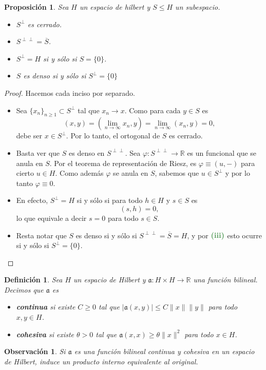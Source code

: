 \documentclass[11pt]{report}
\theoremstyle{colored}
\newtheorem{definition}{Definición}[section]
\newtheorem{proposition}{Proposición}[section]
\newtheorem{remark}{Observación}[section]
\newcommand{\R}{\mathbb{R}}
\newcommand{\ip}[1]{( #1 )}
\newcommand{\paint}[1]{\color{color}{#1}}
\newcommand{\tpaint}[1]{\paint{\textbf{#1}}}
\begin{document}
\begin{proposition} Sea $H$ un espacio de hilbert y $S \leq H$ un subespacio. 
\begin{itemize}
\item[(i)] $S^\perp$ es cerrado.
\item[(i)] $S^{\perp\perp} = \overline{S}$.
\item[(iii)] $S^\perp = H$ si y sólo si $S = \{0\}$.
\item[(iv)] $S$ es denso si y sólo si $S^\perp = \{0\}$
\end{itemize}
\end{proposition}
\begin{proof} Hacemos cada inciso por separado.
\begin{itemize}[listparindent = \parindent]
\item[(i)] Sea $\{x_n\}_{n \geq 1} \subset S^\perp$ tal que $x_n \to x$. Como para cada $y \in S$ es 
\[
\ip{x,y} = \ip{\lim_{n \to \infty}x_n,y} = \lim_{n \to \infty}\ip{x_n,y} = 0,
\]
debe ser $x \in S^\perp$. Por lo tanto, el ortogonal de $S$ es cerrado.
\item[(ii)] Basta ver que $S$ es denso en $S^{\perp\perp}$. Sea $\varphi : S^{\perp \perp} \to \R$ es un funcional que se anula en $S$. Por el teorema de representación de Riesz, es $\varphi \equiv \ip{u,-}$ para cierto $u \in H$. Como además $\varphi$ se anula en $S$, sabemos que $u \in S^\perp$ y por lo tanto $\varphi \equiv 0$. 
\item[(iii)] En efecto, $S^\perp = H$ si y sólo si para todo $h \in H$ y $s \in S$ es
\[ (s,h) = 0, \]
lo que equivale a decir $s = 0$ para todo $s \in S$.
\item[(iv)] Resta notar que $S$ es denso si y sólo si $S^{\perp \perp} = \overline{S} = H$, y por $\tpaint{(iii)}$ esto ocurre si y sólo si $S^\perp = \{0\}$.
\end{itemize}
\end{proof}

\begin{definition} Sea $H$ un espacio de Hilbert y $\mathfrak{a} : H \times H \to \R$ una función bilineal. Decimos que $\mathfrak{a}$ es
\begin{itemize}
\item[$\paint{\bullet}$] \textbf{continua} si existe $C \geq 0$ tal que $|\mathfrak{a}(x,y)| \leq C \|x\|\|y\|$ para todo $x,y \in H$. 
\item[$\paint{\bullet}$] \textbf{cohesiva} si existe $\theta > 0$ tal que $\mathfrak{a}(x,x) \geq \theta \|x\|^2$ para todo $x  \in H$.
\end{itemize}
\end{definition}
\begin{remark} Si $\mathfrak{a}$ es una función bilineal continua y cohesiva en un espacio de Hilbert, induce un producto interno equivalente al original.
\end{remark}
\end{document}
